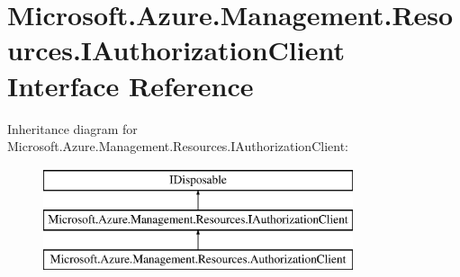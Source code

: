 \hypertarget{interface_microsoft_1_1_azure_1_1_management_1_1_resources_1_1_i_authorization_client}{}\section{Microsoft.\+Azure.\+Management.\+Resources.\+I\+Authorization\+Client Interface Reference}
\label{interface_microsoft_1_1_azure_1_1_management_1_1_resources_1_1_i_authorization_client}


 


Inheritance diagram for Microsoft.\+Azure.\+Management.\+Resources.\+I\+Authorization\+Client\+:\begin{figure}[H]
\begin{center}
\leavevmode
\includegraphics[height=3.000000cm]{interface_microsoft_1_1_azure_1_1_management_1_1_resources_1_1_i_authorization_client}
\end{center}
\end{figure}
